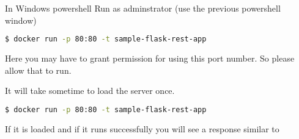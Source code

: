 In Windows powershell Run as adminstrator (use the previous powershell
window)

\begin{lstlisting}[language=bash]
$ docker run -p 80:80 -t sample-flask-rest-app
\end{lstlisting}

Here you may have to grant permission for using this port number. So
please allow that to run.

It will take sometime to load the server once.

\begin{lstlisting}[language=bash]
$ docker run -p 80:80 -t sample-flask-rest-app
\end{lstlisting}

If it is loaded and if it runs successfully you will see a response similar to 

